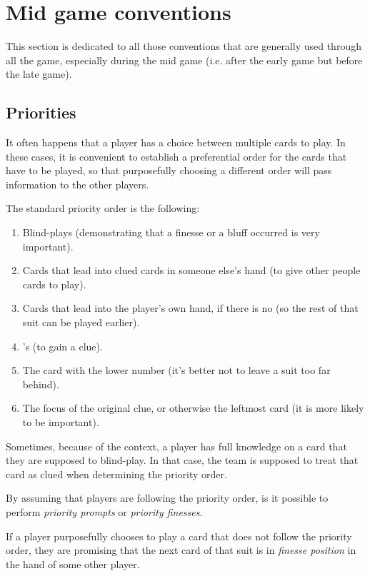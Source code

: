 \section{Mid game conventions}

This section is dedicated to all those conventions that are generally used through all the game, especially during the mid game (i.e. after the early game but before the late game).

\subsection{Priorities}
\label{ssec:priorities}

It often happens that a player has a choice between multiple cards to play. In these cases, it is convenient to establish a preferential order for the cards that have to be played, so that purposefully choosing a different order will pass information to the other players.

\begin{convention}
	The standard priority order is the following:
	\begin{enumerate}
		\item Blind-plays (demonstrating that a finesse or a bluff occurred is very important).
		\item Cards that lead into clued cards in someone else's hand (to give other people cards to play).
		\item Cards that lead into the player's own hand, if there is no  (so the rest of that suit can be played earlier).
		\item {}'s (to gain a clue).
		\item The card with the lower number (it's better not to leave a suit too far behind).
		\item The focus of the original clue, or otherwise the leftmost card (it is more likely to be important).
	\end{enumerate}
\end{convention}

Sometimes, because of the context, a player has full knowledge on a card that they are supposed to blind-play. In that case, the team is supposed to treat that card as clued when determining the priority order.

By assuming that players are following the priority order, is it possible to perform \emph{priority prompts} or \emph{priority finesses}.

\begin{convention}
	If a player purposefully chooses to play a card that does not follow the priority order, they are promising that the next card of that suit is in \emph{finesse position} in the hand of some other player.
\end{convention}

